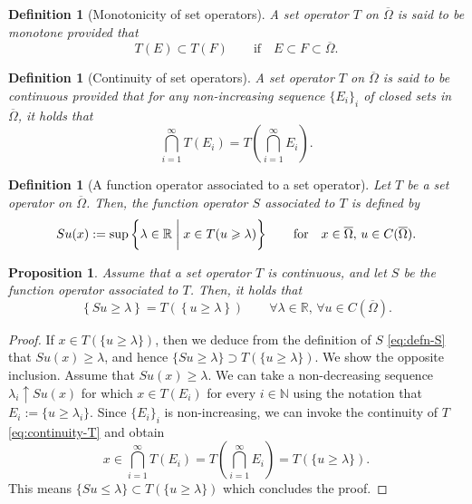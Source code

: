 \documentclass[11pt]{article}
\numberwithin{equation}{section}
\newtheorem{proposition}[theorem]{Proposition}
\newtheorem{defn}[theorem]{Definition}
\newcommand{\R}{\mathbb{R}}
\newcommand{\closure}[1]{\overline{#1}}
\def\leq{\leqslant}
\def\geq{\geqslant}
\begin{document}
\begin{defn}[Monotonicity of set operators]
    A set operator $T$ on $\closure{\Omega}$ is said to be monotone provided that
    $$T(E)\subset T(F)\qquad\mbox{if}\quad E\subset F\subset\closure{\Omega}.$$
\end{defn}

\begin{defn}[Continuity of set operators]
    \label{defn:Th-continuous}
    A set operator $T$ on $\closure{\Omega}$ is said to be continuous
    provided that for any non-increasing sequence $\{E_i\}_i$ of closed sets in $\closure{\Omega}$, it holds that
    \begin{equation}
        \label{eq:continuity-T}
        \bigcap_{i = 1}^\infty T(E_i) = T\left(\bigcap_{i=1}^\infty E_i\right).
    \end{equation}
\end{defn}

\begin{defn}[A function operator associated to a set operator]
    Let $T$ be a set operator on $\closure{\Omega}$. Then, the function operator $S$ associated to $T$ is defined by
    \begin{equation}
        \label{eq:defn-S}
        S u (x) := \sup\left\{\lambda\in\R\biggm| x\in T(u\geq \lambda)\right\}\qquad\mbox{for}\quad x\in\closure{\Omega},\, u\in C(\closure{\Omega}).
    \end{equation}
\end{defn}

\begin{proposition}
    \label{prop:relation-TS}
    Assume that a set operator $T$ is continuous, and let $S$ be the function operator associated to $T$.
    Then, it holds that
    \begin{equation*}
        \left\{Su \geq \lambda\right\} = T(\left\{u\geq \lambda\right\})\qquad \forall\lambda\in\R,\,\forall u\in C(\closure{\Omega}).
    \end{equation*}
\end{proposition}
\begin{proof}
    If $x\in T(\{u\geq \lambda\})$, then we deduce from the definition of $S$ \eqref{eq:defn-S} that $Su(x) \geq \lambda$, and hence $\{Su\geq \lambda\}\supset T(\{u\geq\lambda\})$.
    We show the opposite inclusion. Assume that $Su(x)\geq\lambda$.
    We can take a non-decreasing sequence $\lambda_i\uparrow Su(x)$ for which $x\in T(E_i)$ for every $i\in\mathbb N$ using the notation that $E_i := \{u\geq \lambda_i\}$.
    Since $\{E_i\}_i$ is non-increasing, we can invoke the continuity of $T$ \eqref{eq:continuity-T} and obtain
    \[
    x\in\bigcap_{i=1}^\infty T(E_i) = T\left(\bigcap_{i=1}^\infty E_i\right) = T(\{u\geq \lambda\}).
    \]
    This means $\{Su\leq \lambda\}\subset T(\{u\geq \lambda\})$ which concludes the proof.
\end{proof}
\end{document}
